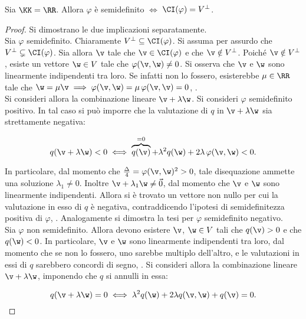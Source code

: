 \begin{proposition} Sia $\KK = \RR$. Allora
	$\varphi$ è semidefinito $\iff$ $\CI(\varphi) = V^\perp$. \label{prop:semidefinitezza_varphi}
\end{proposition}

\begin{proof}
	Si dimostrano le due implicazioni separatamente. \\
	
	\rightproof Sia $\varphi$ semidefinito. Chiaramente $V^\perp \subseteq \CI(\varphi)$. Si assuma per assurdo
	che $V^\perp \subsetneq \CI(\varphi)$. Sia allora $\v$ tale che $\v \in \CI(\varphi)$ e che $\v \notin V^\perp$.
	Poiché $\v \notin V^\perp$, esiste un vettore $\w \in V$ tale che $\varphi(\v, \w) \neq 0$. Si osserva
	che $\v$ e $\w$ sono linearmente indipendenti tra loro. Se infatti non lo fossero, esisterebbe $\mu \in \RR$
	tale che $\w = \mu \v \implies \varphi(\v, \w) = \mu \, \varphi(\v, \v) = 0$, \Lightning. \\
	
	Si consideri allora la combinazione lineare $\v + \lambda \w$. Si consideri $\varphi$ semidefinito positivo.
	In tal caso si può imporre che la valutazione di $q$ in $\v + \lambda \w$ sia strettamente negativa:
	
	\[ q(\v + \lambda \w) < 0 \iff \overbrace{q(\v)}^{=0} + \lambda^2 q(\w) + 2 \lambda \, \varphi(\v, \w) < 0. \]
	
	\vskip 0.05in
	
	In particolare, dal momento che $\frac{\Delta}{4} = \varphi(\v, \w)^2 > 0$, tale disequazione ammette
	una soluzione $\lambda_1 \neq 0$. Inoltre $\v + \lambda_1 \w \neq \vec 0$, dal momento che $\v$ e
	$\w$ sono linearmente indipendenti. Allora si è trovato un vettore non nullo per cui la valutazione in esso
	di $q$ è negativa, contraddicendo l'ipotesi di semidefinitezza positiva di $\varphi$, \Lightning. Analogamente
	si dimostra la tesi per $\varphi$ semidefinito negativo. \\
	
	\leftproof Sia $\varphi$ non semidefinito. Allora devono esistere $\v$, $\w \in V$ tali che
	$q(\v) > 0$ e che $q(\w) < 0$. In particolare, $\v$ e $\w$ sono linearmente indipendenti
	tra loro, dal momento che se non lo fossero, uno sarebbe multiplo dell'altro, e le
	valutazioni in essi di $q$ sarebbero concordi di segno, \Lightning. Si consideri allora
	la combinazione lineare $\v + \lambda \w$, imponendo che $q$ si annulli in essa:
	
	\[ q(\v + \lambda \w) = 0 \iff \lambda^2 q(\w)+ 2 \lambda q(\v, \w) + q(\v) = 0. \]
	

\end{proof}
